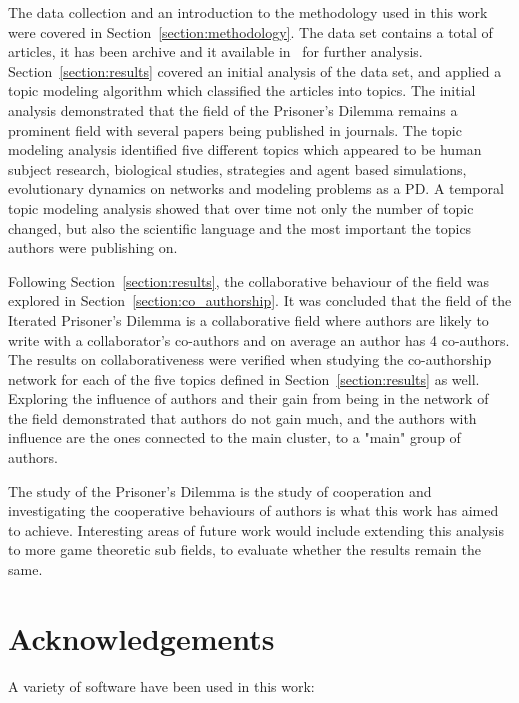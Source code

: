 \documentclass{article}
\theoremstyle{definition}
\newcommand{\totalarticles}{}
\begin{document}
The data collection and an introduction to the methodology used in this work
were covered in Section~\ref{section:methodology}.
The data set contains a total of \totalarticles articles, it has been archive
and it available in~\cite{pd_data_2018} for further analysis.
Section~\ref{section:results} covered an initial analysis of the data set,
and applied a topic modeling algorithm which classified the articles into
topics. The initial analysis demonstrated that the field of the Prisoner's
Dilemma remains a prominent field with several papers being published in journals.
The topic modeling analysis identified five different topics which appeared
to be human subject research, biological studies, strategies and agent based simulations,
evolutionary dynamics on networks and modeling problems as a PD.
A temporal topic modeling analysis showed that over time not only
the number of topic changed, but also the scientific language and the most important
the topics authors were publishing on.

Following Section~\ref{section:results}, the collaborative behaviour of the field was explored
in Section~\ref{section:co_authorship}. It was concluded that the field
of the Iterated Prisoner's Dilemma is a collaborative field where authors
are likely to write with a collaborator's co-authors and on average an author
has 4 co-authors. The results on collaborativeness were verified when studying
the co-authorship network for each of the five topics defined in Section~\ref{section:results}
as well. Exploring the influence of authors and their gain from being in the
network of the field demonstrated that authors do not gain much, and the authors
with influence are the ones connected to the main cluster, to a "main" group of authors.

The study of the Prisoner's Dilemma is the study of cooperation and investigating
the cooperative behaviours of authors is what this work has aimed to achieve.
Interesting areas of future work would include extending this analysis to more
game theoretic sub fields, to evaluate whether the results remain the same.

\section{Acknowledgements}

A variety of software have been used in this work:
\end{document}
